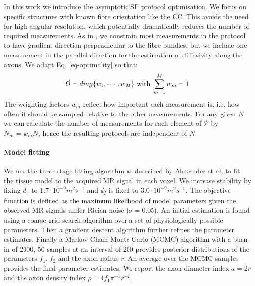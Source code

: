In this work we introduce the asymptotic SF protocol optimisation. We focus on specific structures with known fibre orientation like the CC. This avoids the need for high angular resolution, which potentially dramatically reduces the number of required measurements. As in \cite{assaf2008,barazany2009}, we constrain most measurements in the protocol to have gradient direction perpendicular to the fibre bundles, but we include one measurement in the parallel direction for the estimation of diffusivity along the axons. We adapt Eq. \ref{eq-optimality} so that: 
$$
	\vec{\Omega}=diag\{w_1,\cdots,w_M\} \mbox{ with } \sum_{m=1}^{M}w_m=1
$$
The weighting factors $w_m$ reflect how important each measurement is, i.e. how often it should be sampled relative to the other measurements. For any given $N$ we can calculate the number of measurements for each element of $\mathcal{P}$ by $N_{m}=w_mN$, hence the resulting protocols are independent of $N$.
\paragraph{Model fitting}
We use the three stage fitting algorithm as described by Alexander et al\cite{alexander2009}, to fit the tissue model to the acquired MR signal in each voxel. We increase stability by fixing $d_\parallel$ to $1.7\cdot 10^{-9} m^2s^{-1}$ and $d_I$ is fixed to $3.0\cdot 10^{-9} m^2s^{-1}$\cite{assaf2008,barazany2009,alexander2009}. The objective function is defined as the maximum likelihood of model parameters given the observed MR signals under Rician noise ($\sigma=0.05$). An initial estimation is found using a coarse grid search algorithm over a set of physiologically possible parameters. Then a gradient descent algorithm further refines the parameter estimates. Finally a Markov Chain Monte Carlo (MCMC) algorithm with a burn-in of 2000, 50 samples at an interval of 200 provides posterior distributions of the parameters $f_1$, $f_2$ and the axon radius $r$. An average over the MCMC samples provides the final parameter estimates. We report the axon diameter index $a=2r$ and the axon density index $\rho=4f_1\pi^{-1}r^{-2}$.

